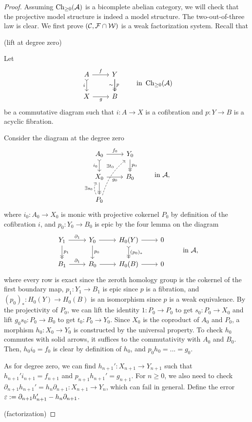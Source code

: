 \documentclass{../../large}
\begin{document}
\begin{proof}
Assuming $\operatorname{Ch}_{\ge0}(\mathcal{A})$ is a bicomplete abelian category, we will check that the projective model structure is indeed a model structure.
The two-out-of-three law is clear.
We first prove $(\mathcal{C},\mathcal{F}\cap\mathcal{W})$ is a weak factorization system.
Recall that 


(lift at degree zero)

Let
\[\begin{tikzcd}
A \dar[>->,swap]{i} \rar{f} & Y \dar[->>]{p}\dar[swap]{\sim} \\
X \rar[swap]{g} & B
\end{tikzcd}\qquad\text{ in }\Ch_{\ge0}(\cA)\]
be a commutative diagram such that $i:A\to X$ is a cofibration and $p:Y\to B$ is a acyclic fibration.

Consider the diagram at the degree zero
\[\begin{tikzcd}
A_0\rar{f_0}\dar[>->,swap]{i_0}&Y_0\dar[->>]{p_0}\\
X_0\rar[swap]{g_0}\dar[->>]&B_0\\
P_0\uar[dashed,bend left]{\exists s_0}\ar[dashed,bend left=16,shift right=1,pos=.7]{uur}{\exists t_0}&
\end{tikzcd}\qquad\text{ in }\cA,\]
where $i_0:A_0\to X_0$ is monic with projective cokernel $P_0$ by definition of the cofibration $i$, and $p_0:Y_0\to B_0$ is epic by the four lemma on the diagram
\[\begin{tikzcd}
Y_1\rar{\partial_1}\dar[->>]{p_1}&Y_0\rar\dar{p_0}&H_0(Y)\dar[>->>]{(p_0)_*} \rar&0\\
B_1\rar{\partial_1}&B_0\rar&H_0(B)\rar&0
\end{tikzcd}\qquad\text{ in }\cA,\]
where every row is exact since the zeroth homology group is the cokernel of the first boundary map, $p_1:Y_1\to B_1$ is epic since $p$ is a fibration, and $(p_0)_*:H_0(Y)\to H_0(B)$ is an isomorphism since $p$ is a weak equivalence.
By the projectivity of $P_0$, we can lift the identity $1:P_0\to P_0$ to get $s_0:P_0\to X_0$ and lift $g_0s_0:P_0\to B_0$ to get $t_0:P_0\to Y_0$.
Since $X_0$ is the coproduct of $A_0$ and $P_0$, a morphism $h_0:X_0\to Y_0$ is constructed by the universal property.
To check $h_0$ commutes with solid arrows, it suffices to the commutativity with $A_0$ and $B_0$.
Then, $h_0i_0=f_0$ is clear by definition of $h_0$, and $p_0h_0=...=g_0$.

As for degree zero, we can find $h_{n+1}':X_{n+1}\to Y_{n+1}$ such that $h_{n+1}'i_{n+1}=f_{n+1}$ and $p_{n+1}h_{n+1}'=g_{n+1}$.
For $n\ge0$, we also need to check $\partial_{n+1}h_{n+1}'=h_n\partial_{n+1}:X_{n+1}\to Y_n$, which can fail in general.
Define the error $\varepsilon:=\partial_{n+1}h_{n+1}'-h_n\partial_{n+1}$.



(factorization)

\end{proof}
\end{document}
